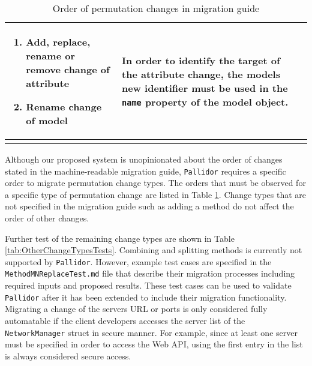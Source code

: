 \begin{longtable}{@{}p{}>{\raggedright\arraybackslash}p{}p{}@{}}
\begin{enumerate}[leftmargin=*]
			\setlength\itemsep{0.05em}
			\item Add, replace, rename or remove change of attribute
			\item Rename change of model
		\end{enumerate}           &     In order to identify the target of the attribute change, the models new identifier must be used in the \texttt{name} property of the model object.      \\ \bottomrule
	\caption{Order of permutation changes in migration guide}
\label{tab:ChangeOrder}
	\end{longtable}


\vspace{-0.5cm}
Although our proposed system is unopinionated about the order of changes stated in the machine-readable migration guide, \texttt{Pallidor} requires a specific order to migrate permutation change types. The orders that must be observed for a specific type of permutation change are listed in Table \ref{tab:ChangeOrder}. Change types that are not specified in the migration guide such as adding a method do not affect the order of other changes.

Further test of the remaining change types are shown in Table \ref{tab:OtherChangeTypesTests}. Combining and splitting methods is currently not supported by \texttt{Pallidor}. However, example test cases are specified in the \texttt{MethodMNReplaceTest.md} file that describe their migration processes including required inputs and proposed results. These test cases can be used to validate \texttt{Pallidor} after it has been extended to include their migration functionality. Migrating a change of the servers URL or ports is only considered fully automatable if the client developers accesses the server list of the \texttt{NetworkManager} struct in secure manner. For example, since at least one server must be specified in order to access the Web API, using the first entry in the list is always considered secure access.

